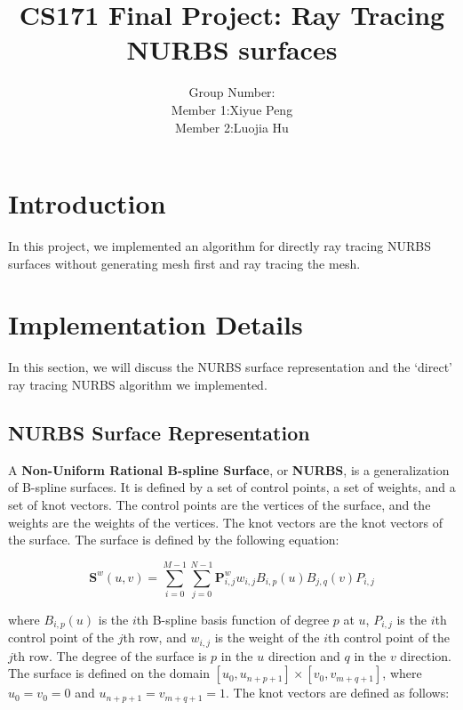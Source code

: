 \documentclass[acmtog]{acmart}
\title{CS171 Final Project: {Ray Tracing NURBS surfaces}}
\author{Group Number:\quad 10 \\
Member 1:\quad Xiyue Peng\\
Member 2:\quad Luojia Hu
}
\begin{document}
\maketitle

\vspace*{2 ex}

\section{Introduction}

In this project, we implemented an algorithm for directly ray tracing NURBS surfaces without generating mesh first and ray tracing the mesh. %

\section{Implementation Details}

In this section, we will discuss the NURBS surface representation and the `direct' ray tracing NURBS algorithm we implemented.

\subsection{NURBS Surface Representation}


A \textbf{Non-Uniform Rational B-spline Surface}, or \textbf{NURBS}, is a generalization of B-spline surfaces. It is defined by a set of control points, a set of weights, and a set of knot vectors. The control points are the vertices of the surface, and the weights are the weights of the vertices. The knot vectors are the knot vectors of the surface. The surface is defined by the following equation: 

\begin{equation}
	\label{eq:1} %
	\mathbf{S}^w(u,v) = \sum_{i=0}^{M-1} \sum_{j=0}^{N-1} \mathbf{P}_{i,j}^w w_{i,j} B_{i,p}(u) B_{j,q}(v) P_{i,j}
\end{equation}

where $B_{i,p}(u)$ is the $i$th B-spline basis function of degree $p$ at $u$, $P_{i,j}$ is the $i$th control point of the $j$th row, and $w_{i,j}$ is the weight of the $i$th control point of the $j$th row. The degree of the surface is $p$ in the $u$ direction and $q$ in the $v$ direction. The surface is defined on the domain $[u_{0}, u_{n+p+1}] \times [v_{0}, v_{m+q+1}]$, where $u_{0} = v_{0} = 0$ and $u_{n+p+1} = v_{m+q+1} = 1$. The knot vectors are defined as follows:
\end{document}
